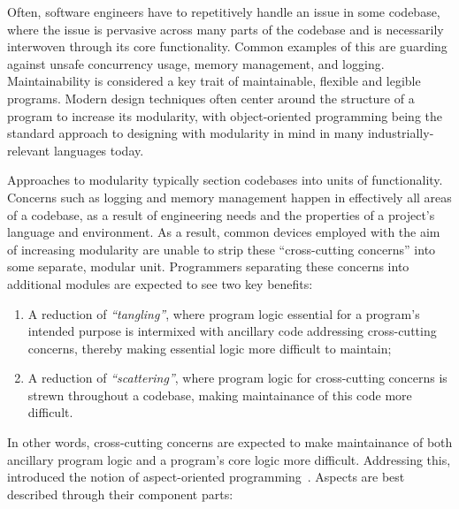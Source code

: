 
Often, software engineers have to repetitively handle an issue in some codebase,
where the issue is pervasive across many parts of the codebase and is
necessarily interwoven through its core functionality. Common examples of this
are guarding against unsafe concurrency usage, memory management, and logging.
Maintainability is considered a key trait of maintainable, flexible and legible
programs\cite{Parnas_1972}. Modern design techniques often center around the
structure of a program to increase its modularity, with object-oriented
programming being the standard approach to designing with modularity in mind in
many industrially-relevant languages today. 

Approaches to modularity typically section codebases into units of
functionality. Concerns such as logging and memory management happen in
effectively all areas of a codebase, as a result of engineering needs and the
properties of a project's language and environment. As a result, common devices
employed with the aim of increasing modularity are unable to strip these
``cross-cutting concerns'' into some separate, modular unit. Programmers
separating these concerns into additional modules are expected to see two key
benefits:

\begin{enumerate}
    \item A reduction of \emph{``tangling''}, where program logic essential for
    a program's intended purpose is intermixed with ancillary code addressing
    cross-cutting concerns, thereby making essential logic more difficult to maintain;
    \item A reduction of \emph{``scattering''}, where program logic for
    cross-cutting concerns is strewn throughout a codebase, making maintainance
    of this code more difficult.
\end{enumerate}

In other words, cross-cutting concerns are expected to make maintainance of both
ancillary program logic and a program's core logic more difficult. Addressing this, \citeauthor{kiczales1997aspect} introduced the notion
of aspect-oriented programming~\cite{kiczales1997aspect}. Aspects are best described through their
component parts:

